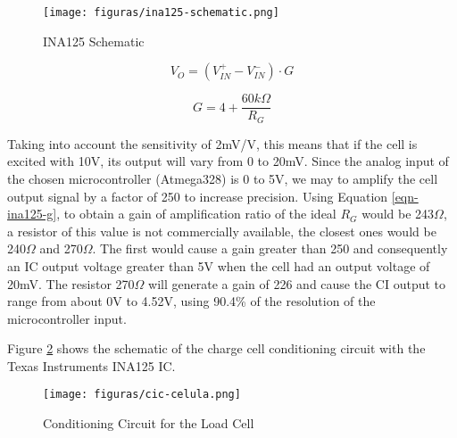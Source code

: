 		\begin{figure}[htbp]
			\centering
				\texttt{[image: figuras/ina125-schematic.png]}
			\caption{INA125 Schematic \cite{ina125data}}
			\label{fig-ina125-schematic}
		\end{figure}

		\begin{equation}\label{eqn-ina125-vo}
			V_{O}=(V_{IN}^{+} - V_{IN}^{-} ) \cdot G
		\end{equation}

		\begin{equation}\label{eqn-ina125-g}
			G=4 + \frac{60k\Omega}{R_{G}}
		\end{equation}

		Taking into account the sensitivity of 2mV/V, this means that if the cell is excited with 10V, its output will vary from 0 to 20mV. Since the analog input of the chosen microcontroller (Atmega328) is 0 to 5V, we may to amplify the cell output signal by a factor of 250 to increase precision. Using Equation \ref{eqn-ina125-g}, to obtain a gain of amplification ratio of the ideal $R_{G}$ would be 243$\Omega$, a resistor of this value is not commercially available, the closest ones would be 240$\Omega$ and 270$\Omega$. The first would cause a gain greater than 250 and consequently an IC output voltage greater than 5V when the cell had an output voltage of 20mV. The resistor 270$\Omega$ will generate a gain of 226 and cause the CI output to range from about 0V to 4.52V, using 90.4\% of the resolution of the microcontroller input. 
		\par

		Figure \ref{fig-cic-cell} shows the schematic of the charge cell conditioning circuit with the Texas Instruments INA125 IC.

		\begin{figure}[htbp]
			\centering
				\texttt{[image: figuras/cic-celula.png]}
			\caption{Conditioning Circuit for the Load Cell}
			\label{fig-cic-cell}
		\end{figure}